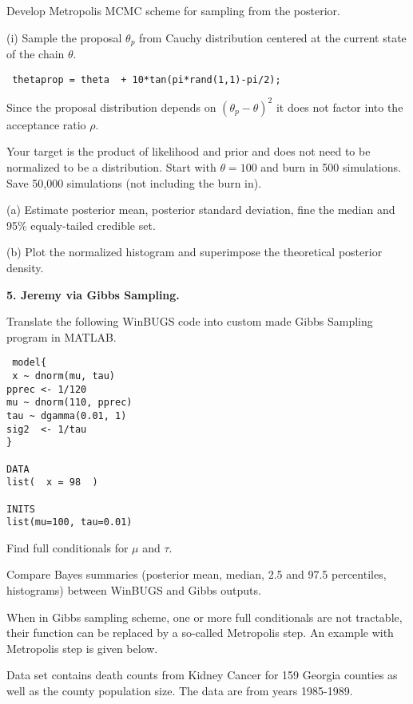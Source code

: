 \documentclass[12pt]{article}
\begin{document}
Develop Metropolis MCMC scheme for sampling from the posterior.

(i) Sample the proposal  $\theta_p$  from Cauchy distribution centered at the current
state of the chain $\theta$.

\begin{verbatim}
 thetaprop = theta  + 10*tan(pi*rand(1,1)-pi/2);
 \end{verbatim}

 Since the proposal distribution depends on $(\theta_p - \theta)^2$ it does not
 factor into the acceptance ratio $\rho.$

 Your target is the product of likelihood and prior and does not need
 to be normalized to be a distribution. Start with $\theta = 100$ and burn in 500 simulations.
 Save 50,000 simulations (not including the burn in).

 (a) Estimate posterior mean, posterior standard deviation, fine the median and
 95\% equaly-tailed credible set.

  (b) Plot the normalized histogram and superimpose the
  theoretical posterior density.


\vspace*{0.3in}

\noindent
{\bf 5. Jeremy via Gibbs Sampling.~}

Translate the following WinBUGS code into custom made Gibbs Sampling program in MATLAB.

\begin{verbatim}
 model{
 x ~ dnorm(mu, tau)
pprec <- 1/120
mu ~ dnorm(110, pprec)
tau ~ dgamma(0.01, 1)
sig2  <- 1/tau
}

DATA
list(  x = 98  )

INITS
list(mu=100, tau=0.01)
\end{verbatim}

Find full conditionals for $\mu$ and $\tau$.

Compare Bayes summaries (posterior mean, median, 2.5 and 97.5 percentiles, histograms)
between WinBUGS and Gibbs outputs.



\vspace*{0.3in}
When in Gibbs sampling scheme, one or more full conditionals are
not tractable, their function can be replaced by a so-called Metropolis step.
An example with Metropolis step is given below.

\vspace*{0.25in}
%
 Data set contains death counts from Kidney Cancer for 159 Georgia counties as well
 as the county population size. The data are from years 1985-1989.
\end{document}
